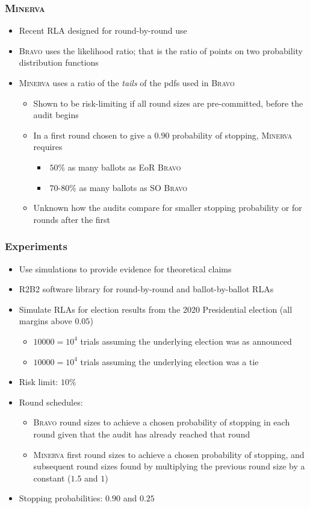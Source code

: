 \documentclass[aspectratio=169]{beamer}
\newcommand{\Minerva}{\textsc{Minerva}\xspace}
\newcommand{\BRAVO}{\textsc{Bravo}\xspace}
\begin{document}
\begin{frame}
\frametitle{\Minerva}
\begin{itemize}
\item Recent RLA designed for round-by-round use
\pause 
\item \BRAVO uses the likelihood ratio; that is the ratio of points on two probability distribution functions
\pause 
\item \Minerva uses a ratio of the \emph{tails} of the pdfs used in \BRAVO
\pause 
\begin{itemize}
\item Shown to be risk-limiting if all round sizes are pre-committed, before the audit begins
\pause 
\item In a first round chosen to give a $0.90$ probability of stopping, \Minerva requires
\begin{itemize}
\item $~50\%$ as many ballots as EoR \BRAVO 
\item $~70\text{-}80\%$ as many ballots as SO \BRAVO 
\end{itemize}
\pause 
\item Unknown how the audits compare for smaller stopping probability or for rounds after the first
\end{itemize}
\end{itemize}
\end{frame}

\begin{frame}
\frametitle{Experiments}
\begin{itemize}
\item Use simulations to provide evidence for theoretical claims
\pause 
\item R2B2 software library for round-by-round and ballot-by-ballot RLAs
\pause 
\item Simulate RLAs for election results from the 2020 Presidential election (all margins above $0.05$)
\begin{itemize}
\item $10000=10^4$ trials assuming the underlying election was as announced
\item $10000=10^4$ trials assuming the underlying election was a tie
\end{itemize}
\pause 
\item Risk limit: $10\%$
\pause 
\item Round schedules:
\begin{itemize}
\item \BRAVO round sizes to achieve a chosen probability of stopping in each round given that the audit has already reached that round
\pause 
\item \Minerva first round sizes to achieve a chosen probability of stopping, and subsequent round sizes found by multiplying the previous round size by a constant ($1.5$ and $1$)
\end{itemize}
\pause 
\item Stopping probabilities: $0.90$ and $0.25$
\end{itemize}
\end{frame}
\end{document}
